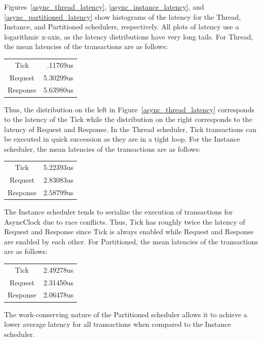 Figures~\ref{async_thread_latency}, \ref{async_instance_latency}, and \ref{async_partitioned_latency} show histograms of the latency for the Thread, Instance, and Partitioned schedulers, respectively.
All plots of latency use a logarithmic x-axis, as the latency distributions have very long tails.
For Thread, the mean latencies of the transactions are as follows:
\begin{center}
\begin{tabular}{cr}
Tick     &  .11769us \\
Request  & 5.30299us \\
Response & 5.63980us \\
\end{tabular}
\end{center}
Thus, the distribution on the left in Figure~\ref{async_thread_latency} corresponds to the latency of the Tick while the distribution on the right corresponds to the latency of Request and Response.
In the Thread scheduler, Tick transactions can be executed in quick succession as they are in a tight loop.
For the Instance scheduler, the mean latencies of the transactions are as follows:
\begin{center}
\begin{tabular}{cr}
Tick     & 5.22393us \\
Request  & 2.83083us \\
Response & 2.58799us \\
\end{tabular}
\end{center}
The Instance scheduler tends to serialize the execution of transactions for AsyncClock due to race conflicts.
Thus, Tick has roughly twice the latency of Request and Response since Tick is always enabled while Request and Response are enabled by each other.
For Partitioned, the mean latencies of the transactions are as follows:
\begin{center}
\begin{tabular}{cr}
Tick     & 2.49278us \\
Request  & 2.31450us \\
Response & 2.06478us \\
\end{tabular}
\end{center}
The work-conserving nature of the Partitioned scheduler allows it to achieve a lower average latency for all transactions when compared to the Instance scheduler.

